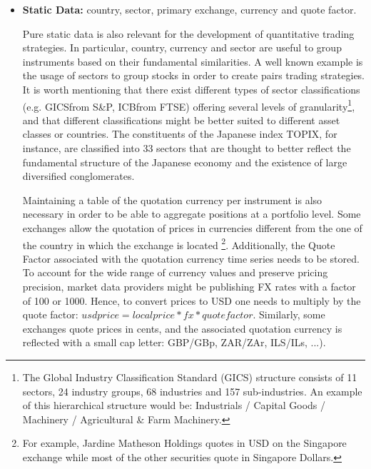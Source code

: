 \begin{itemize}
Stocks quotation can be suspended as a cooling mechanism (often at the request of the underlying company) to prevent excess price volatility when significant information is about to be released to the market. Depending on the situation, the suspension can be temporary and intraday, or can last for extended periods of time if the market place allows it\footnote{For instance, it was the case for a large number of companies in China in 2016.}. Suspensions result in gaps in time series and are worth keeping track of as they can impact strategies backtesting (inability to to enter or exit a position, uncertainty in the pricing of composite assets if a given stock has a significant weight in ETFs or Indexes). 
Some markets will also suspend trading if the price swings more than a predefined amount (limit up / limit down situations) for either a period of time or for the remainder of the trading session.

\item \textbf{Static Data:} country, sector, primary exchange, currency and quote factor.

Pure static data is also relevant for the development of quantitative trading strategies. In particular, country, currency and sector are useful to group instruments based on their fundamental similarities. A well known example is the usage of sectors to group stocks in order to create pairs trading strategies. It is worth mentioning that there exist different types of sector classifications (e.g. GICS\textsuperscript\textregistered from S\&P, ICB\textsuperscript\textregistered from FTSE) offering several levels of granularity\footnote{The Global Industry Classification Standard (GICS) structure consists of 11 sectors, 24 industry groups, 68 industries and 157 sub-industries. An example of this hierarchical structure would be: Industrials / Capital Goods / Machinery / Agricultural \& Farm Machinery.}, and that different classifications might be better suited to different asset classes or countries. The constituents of the Japanese index TOPIX, for instance, are classified into 33 sectors that are thought to better reflect the fundamental structure of the Japanese economy and the existence of large diversified conglomerates. 

Maintaining a table of the quotation currency per instrument is also necessary in order to be able to aggregate positions at a portfolio level. Some exchanges allow the quotation of prices in currencies different from the one of the country in which the exchange is located \footnote{For example, Jardine Matheson Holdings quotes in USD on the Singapore exchange while most of the other securities quote in Singapore Dollars.}. Additionally, the Quote Factor associated with the quotation currency time series needs to be stored. To account for the wide range of currency values and preserve pricing precision, market data providers might be publishing FX rates with a factor of 100 or 1000. Hence, to convert prices to USD one needs to multiply by the quote factor: $usd price = local price * fx * quote factor$. Similarly, some exchanges quote prices in cents, and the associated quotation currency is reflected with a small cap letter: GBP/GBp, ZAR/ZAr, ILS/ILs, ...).


\end{itemize}
